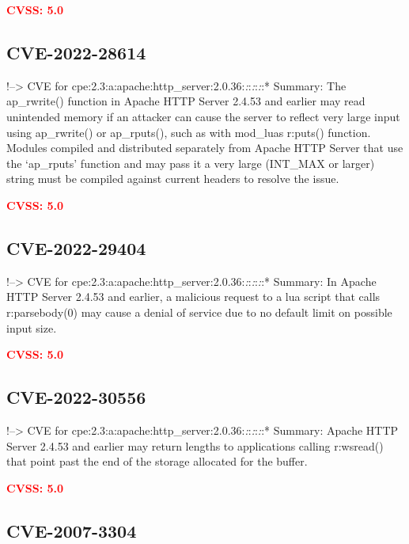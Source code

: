 \documentclass[a4paper, 12pt]{article}
\begin{document}
\textbf{\textcolor{red}{CVSS: 5.0}}

\hypertarget{cve-2022-28614}{%
\subsection{CVE-2022-28614}\label{cve-2022-28614}}

!--\textgreater{} CVE for
cpe:2.3:a:apache:http\_server:2.0.36:\emph{:}:\emph{:}:\emph{:}:*
Summary: The ap\_rwrite() function in Apache HTTP Server 2.4.53 and
earlier may read unintended memory if an attacker can cause the server
to reflect very large input using ap\_rwrite() or ap\_rputs(), such as
with mod\_luas r:puts() function. Modules compiled and distributed
separately from Apache HTTP Server that use the `ap\_rputs' function and
may pass it a very large (INT\_MAX or larger) string must be compiled
against current headers to resolve the issue.

\textbf{\textcolor{red}{CVSS: 5.0}}

\hypertarget{cve-2022-29404}{%
\subsection{CVE-2022-29404}\label{cve-2022-29404}}

!--\textgreater{} CVE for
cpe:2.3:a:apache:http\_server:2.0.36:\emph{:}:\emph{:}:\emph{:}:*
Summary: In Apache HTTP Server 2.4.53 and earlier, a malicious request
to a lua script that calls r:parsebody(0) may cause a denial of service
due to no default limit on possible input size.

\textbf{\textcolor{red}{CVSS: 5.0}}

\hypertarget{cve-2022-30556}{%
\subsection{CVE-2022-30556}\label{cve-2022-30556}}

!--\textgreater{} CVE for
cpe:2.3:a:apache:http\_server:2.0.36:\emph{:}:\emph{:}:\emph{:}:*
Summary: Apache HTTP Server 2.4.53 and earlier may return lengths to
applications calling r:wsread() that point past the end of the storage
allocated for the buffer.

\textbf{\textcolor{red}{CVSS: 5.0}}

\hypertarget{cve-2007-3304}{%
\subsection{CVE-2007-3304}\label{cve-2007-3304}}
\end{document}
